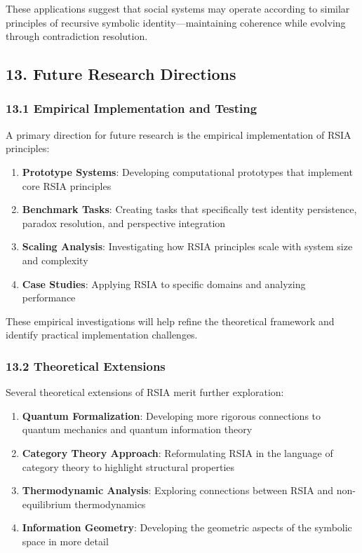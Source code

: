 \documentclass[12pt]{article}
\providecommand{\tightlist}{%
  \setlength{\itemsep}{0pt}\setlength{\parskip}{0pt}}
\begin{document}
These applications suggest that social systems may operate according to
similar principles of recursive symbolic identity---maintaining
coherence while evolving through contradiction resolution.

\subsection{13. Future Research
Directions}\label{future-research-directions}

\subsubsection{13.1 Empirical Implementation and
Testing}\label{empirical-implementation-and-testing}

A primary direction for future research is the empirical implementation
of RSIA principles:

\begin{enumerate}
\def\labelenumi{\arabic{enumi}.}
\tightlist{}
\item
  \textbf{Prototype Systems}: Developing computational prototypes that
  implement core RSIA principles
\item
  \textbf{Benchmark Tasks}: Creating tasks that specifically test
  identity persistence, paradox resolution, and perspective integration
\item
  \textbf{Scaling Analysis}: Investigating how RSIA principles scale
  with system size and complexity
\item
  \textbf{Case Studies}: Applying RSIA to specific domains and analyzing
  performance
\end{enumerate}

These empirical investigations will help refine the theoretical
framework and identify practical implementation challenges.

\subsubsection{13.2 Theoretical
Extensions}\label{theoretical-extensions}

Several theoretical extensions of RSIA merit further exploration:

\begin{enumerate}
\def\labelenumi{\arabic{enumi}.}
\tightlist
\item
  \textbf{Quantum Formalization}: Developing more rigorous connections
  to quantum mechanics and quantum information theory
\item
  \textbf{Category Theory Approach}: Reformulating RSIA in the language
  of category theory to highlight structural properties
\item
  \textbf{Thermodynamic Analysis}: Exploring connections between RSIA
  and non-equilibrium thermodynamics
\item
  \textbf{Information Geometry}: Developing the geometric aspects of the
  symbolic space in more detail
\end{enumerate}
\end{document}
